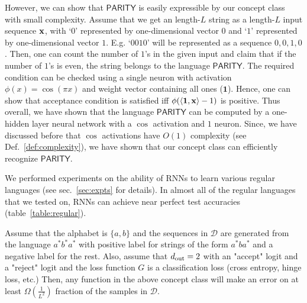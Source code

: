 However, we can show that $\mathsf{PARITY}$ is easily expressible by our concept class with small complexity. Assume that we get an length-$L$ string as a length-$L$ input sequence $\mathbf{x}$, with `$0$' represented by one-dimensional vector $0$ and `$1$' represented by one-dimensional vector $1$. E.g. `$0010$' will be represented as a sequence $0,0,1,0$. Then, one can count the number of $1$'s in the given input and claim that if the number of $1$'s is even, the string belongs to the language $\mathsf{PARITY}$. The required condition can be checked using a single neuron with activation $\phi(x) = \cos(\pi x)$ and weight vector containing all ones ($\mathbf{1}$). Hence, one can show that acceptance condition is satisfied iff $\phi( \langle\mathbf{1}, \mathbf{x}\rangle - 1)$ is positive. Thus overall, we have shown that the language $\mathsf{PARITY}$ can be computed by a one-hidden layer neural network with a $\cos$ activation and $1$ neuron. Since, we have discussed before that $\cos$ activations have $O(1)$ complexity (see Def.~\ref{def:complexity}), we have shown that our concept class can efficiently recognize $\mathsf{PARITY}$.





We performed experiments on the ability of RNNs to learn various regular languages (see sec.~\ref{sec:expts} for details). In almost all of the regular languages that we tested on, RNNs can achieve near perfect test accuracies (table~\ref{table:regular}).

 \iffalse    
    \begin{theorem}
         Assume that the alphabet is $\{a, b\}$ and the sequences in $\mathcal{D}$ are generated from the language $a^{\ast}b^{\ast}a^{\ast}$ with positive label for strings of the form $a^{\ast} b a^{\ast}$ and a negative label for the rest. Also, assume that $d_{\mathrm{out}} =2$ with an "accept" logit and a "reject" logit and the loss function $G$ is a classification loss (cross entropy, hinge loss, etc.) Then, any function in the above concept class will make an error on at least $\Omega(\frac{1}{L^2})$ fraction of the samples in $\mathcal{D}$.
    \end{theorem}
    

